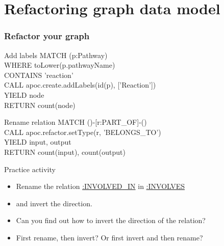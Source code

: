 \documentclass[12pt]{beamer}
\begin{document}
    
    \section{Refactoring graph data model}
    \begin{frame}
        \frametitle{Refactor your graph}
        \begin{block}{Add labels}
            MATCH (p:Pathway)\\
            \hspace{1cm} WHERE toLower(p.pathwayName)\\
            \hspace{1cm} CONTAINS 'reaction'\\
            CALL apoc.create.addLabels(id(p), ['Reaction'])\\
            \hspace{1cm} YIELD node\\
            RETURN count(node)
        \end{block}
        \begin{block}{Rename relation}
            MATCH ()-[r:PART\_OF]-()\\
            CALL apoc.refactor.setType(r, 'BELONGS\_TO')\\
            YIELD input, output\\
            RETURN count(input), count(output)\\
        \end{block}
    \end{frame}
    
    \begin{frame}{Practice activity}
        \begin{itemize}
            \item Rename the relation \url{:INVOLVED_IN} in \url{:INVOLVES}
            \item and invert the direction.
            \item Can you find out how to invert the direction of the relation?
            \item First rename, then invert? Or first invert and then rename? 
        \end{itemize}
    \end{frame}
    
\end{document}
